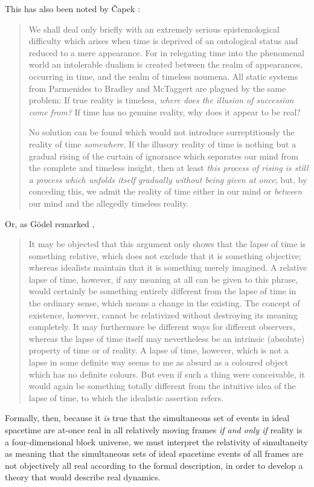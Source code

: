 This has also been noted by \v{C}apek \cite{Capek1961}:
\begin{quotation}
We shall deal only briefly with an extremely serious epistemological difficulty which arises when time is deprived of an ontological status and reduced to a mere appearance. For in relegating time into the phenomenal world an intolerable dualism is created between the realm of appearances, occurring in time, and the realm of timeless noumena. All static systems from Parmenides to Bradley and McTaggert are plagued by the same problem: If true reality is timeless, \textit{where does the illusion of succession come from?} If time has no genuine reality, why does it appear to be real?

No solution can be found which would not introduce surreptitiously the reality of time \textit{somewhere}. If the illusory reality of time is nothing but a gradual rising of the curtain of ignorance which separates our mind from the complete and timeless insight, then at least \textit{this process of rising is still a process which unfolds itself gradually without being given at once}; but, by conceding this, we admit the reality of time either in our mind or \textit{between} our mind and the allegedly timeless reality.
\end{quotation} 
Or, as G\"{o}del remarked \cite{Einstein1951}, 
\begin{quotation}
It may be objected that this argument only shows that the lapse of time is something relative, which does not exclude that it is something objective; whereas idealists maintain that it is something merely imagined. A relative lapse of time, however, if any meaning at all can be given to this phrase, would certainly be something entirely different from the lapse of time in the ordinary sense, which means a change in the existing. The concept of existence, however, cannot be relativized without destroying its meaning completely. It may furthermore be different ways for different observers, whereas the lapse of time itself may nevertheless be an intrinsic (absolute) property of time or of reality.  A lapse of time, however, which is not a lapse in some definite way seems to me as absurd as a coloured object which has no definite colours. But even if such a thing were conceivable, it would again be something totally different from the intuitive idea of the lapse of time, to which the idealistic assertion refers.
\end{quotation}

Formally, then, because it \textit{is} true that the simultaneous set of events in ideal spacetime are at-once real in all relatively moving frames \textit{if and only if} reality is a four-dimensional block universe, we must interpret the relativity of simultaneity as meaning that the simultaneous sets of ideal spacetime events of all frames are not objectively all real according to the formal description, in order to develop a theory that would describe real dynamics.

